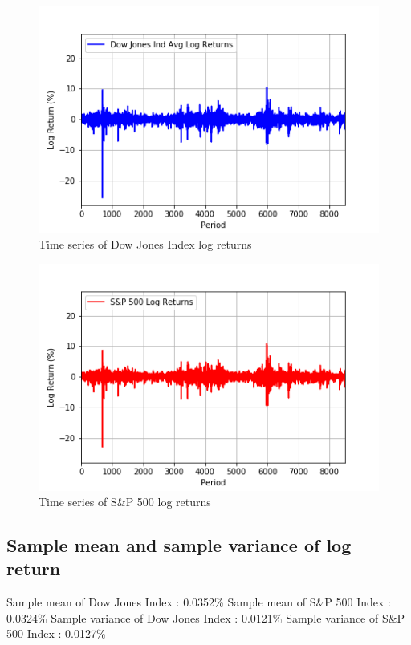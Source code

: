 \documentclass[a4paper]{article}
\begin{document}
\begin{figure}[h!]
	\includegraphics[width=\linewidth]{DJI_logret.png}
	\caption{Time series of Dow Jones Index log returns}
\end{figure}
\begin{figure}[h!]
	\includegraphics[width=\linewidth]{SP_logret.png}
	\caption{Time series of S\&P 500 log returns}
\end{figure}

\subsection{Sample mean and sample variance of log return}
\begin{flushleft}
Sample mean of Dow Jones Index : 0.0352\%  \linebreak 
Sample mean of S\&P 500 Index : 0.0324\%  \linebreak 
Sample variance of Dow Jones Index : 0.0121\%  \linebreak 
Sample variance of S\&P 500 Index : 0.0127\%  \linebreak 
\end{flushleft}
\end{document}
